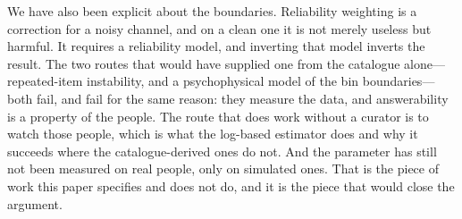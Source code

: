 We have also been explicit about the boundaries. Reliability weighting is a
correction for a noisy channel, and on a clean one it is not merely useless but
harmful. It requires a reliability model, and inverting that model inverts the
result. The two routes that would have supplied one from the catalogue
alone---repeated-item instability, and a psychophysical model of the bin
boundaries---both fail, and fail for the same reason: they measure the data,
and answerability is a property of the people. The route that does work without
a curator is to watch those people, which is what the log-based estimator does
and why it succeeds where the catalogue-derived ones do not. And the parameter
has still not been measured on real people, only on simulated ones. That is the
piece of work this paper specifies and does not do, and it is the piece that
would close the argument.
